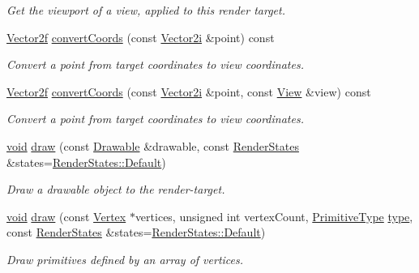 \begin{DoxyCompactItemize}
\begin{DoxyCompactList}\small\item\em Get the viewport of a view, applied to this render target. \end{DoxyCompactList}\item 
\hyperlink{namespacesf_acf03098c2577b869e2fa6836cc48f1a0}{Vector2f} \hyperlink{classsf_1_1_render_target_afc047333937f7cb7fe557aec60239233}{convert\-Coords} (const \hyperlink{namespacesf_ace09dd1447d74c6e9ba56ae874c094e1}{Vector2i} \&point) const 
\begin{DoxyCompactList}\small\item\em Convert a point from target coordinates to view coordinates. \end{DoxyCompactList}\item 
\hyperlink{namespacesf_acf03098c2577b869e2fa6836cc48f1a0}{Vector2f} \hyperlink{classsf_1_1_render_target_ae5e7ba65ef73df2778b29b7fdcdb20ee}{convert\-Coords} (const \hyperlink{namespacesf_ace09dd1447d74c6e9ba56ae874c094e1}{Vector2i} \&point, const \hyperlink{classsf_1_1_view}{View} \&view) const 
\begin{DoxyCompactList}\small\item\em Convert a point from target coordinates to view coordinates. \end{DoxyCompactList}\item 
\hyperlink{glutf90_8h_ac778d6f63f1aaf8ebda0ce6ac821b56e}{void} \hyperlink{classsf_1_1_render_target_a12417a3bcc245c41d957b29583556f39}{draw} (const \hyperlink{classsf_1_1_drawable}{Drawable} \&drawable, const \hyperlink{classsf_1_1_render_states}{Render\-States} \&states=\hyperlink{classsf_1_1_render_states_ad29672df29f19ce50c3021d95f2bb062}{Render\-States\-::\-Default})
\begin{DoxyCompactList}\small\item\em Draw a drawable object to the render-\/target. \end{DoxyCompactList}\item 
\hyperlink{glutf90_8h_ac778d6f63f1aaf8ebda0ce6ac821b56e}{void} \hyperlink{classsf_1_1_render_target_ab636d7363f6681077361ee274ba89a8d}{draw} (const \hyperlink{classsf_1_1_vertex}{Vertex} $\ast$vertices, unsigned int vertex\-Count, \hyperlink{group__graphics_ga5ee56ac1339984909610713096283b1b}{Primitive\-Type} \hyperlink{gl3_8h_a984aabed544368e7fe0e566d7cf014a7}{type}, const \hyperlink{classsf_1_1_render_states}{Render\-States} \&states=\hyperlink{classsf_1_1_render_states_ad29672df29f19ce50c3021d95f2bb062}{Render\-States\-::\-Default})
\begin{DoxyCompactList}\small\item\em Draw primitives defined by an array of vertices. \end{DoxyCompactList}\item 

\end{DoxyCompactItemize}
